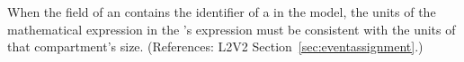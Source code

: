 When the  field of an \EventAssignment
contains the identifier of a \Compartment in the model, the
units of the mathematical expression in the
\EventAssignment's  expression must be
consistent with the units of that compartment's size.
(References: L2V2 Section~\ref{sec:eventassignment}.)
